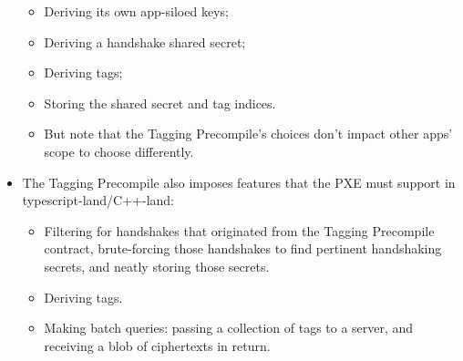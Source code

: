 \begin{itemize}
    \begin{itemize}
        \item Deriving its own app-siloed keys;
        \item Deriving a handshake shared secret;
        \item Deriving tags;
        \item Storing the shared secret and tag indices.
        \item But note that the Tagging Precompile's choices don't impact other apps' scope to choose differently.
    \end{itemize}
    \item The Tagging Precompile also imposes features that the PXE must support in typescript-land/C++-land:
    \begin{itemize}
        \item Filtering for handshakes that originated from the Tagging Precompile contract, brute-forcing those handshakes to find pertinent handshaking secrets, and neatly storing those secrets.
        \item Deriving tags.
        \item Making batch queries: passing a collection of tags to a server, and receiving a blob of ciphertexts in return.
    \end{itemize}
    
\end{itemize}